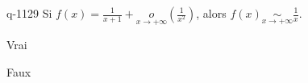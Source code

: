 \begin{truefalse}{q-1129}
Si $f(x)=\frac1{x+1}+\underset{x\to+\infty}o\left(\frac1{x^2}\right)$, alors $f(x)\underset{x\to+\infty}{\sim}\frac1{x}$.
\item* Vrai
\item Faux
\end{truefalse}

